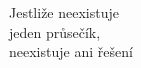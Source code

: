 \documentclass[preview]{standalone}
\begin{document}
\begin{center}
Jestliže neexistuje\\ jeden průsečík,\\ neexistuje ani řešení
\end{center}
\end{document}
